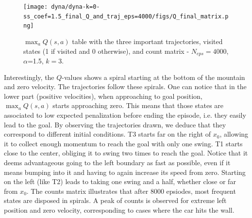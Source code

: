 \documentclass[a4paper, 12pt,oneside]{article}
\begin{document}
        \begin{figure}[h]
            \centering
            \texttt{[image: dyna/dyna-k=0-ss\_coef=1.5\_final\_Q\_and\_traj\_eps=4000/figs/Q\_final\_matrix.png]}
            \caption{$\max_a Q(s,a)$ table with the three important trajectories, visited states (1 if visited and 0 otherwise), and count matrix - $N_{eps}=4000$, $\alpha$=1.5, $k=3$.}
            \label{Qmatrixcounts}
        \end{figure}

        Interestingly, the $Q$-values shows a spiral starting at the bottom of the mountain and zero velocity. The trajectories follow these spirals. 
        One can notice that in the lower part (positive velocities), when approaching to goal position, $\max_a Q(s,a)$ starts approaching zero. This means that those states are associated to low expected penalization before ending the episode, i.e. they easily lead to the goal.  
        By observing the trajectories drawn, we deduce that they correspond to different initial conditions. T3 starts far on the right of $x_0$, allowing it to collect enough momentum to reach the goal with only one swing. T1 starts close to the center, obliging it to swing two times to reach the goal. Notice that it deems advantageous going to the left boundary as fast as possible, even if it means bumping into it and having to again increase its speed from zero. Starting on the left (like T2) leads to taking one swing and a half, whether close or far from $x_0$. 
        The counts matrix illustrates that after 8000 epsiodes, most frequent states are disposed in spirals. A peak of counts is observed for extreme left position and zero velocity, corresponding to cases where the car hits the wall. 
\end{document}
